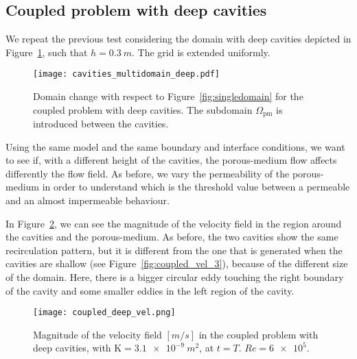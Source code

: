 \subsection{Coupled problem with deep cavities}
We repeat the previous test considering the domain with deep cavities depicted in Figure~\ref{fig:multidomain_deep}, such that $h=\SI{0.3}{m}$. The grid is extended uniformly.
\begin{figure}
	\centering
	\texttt{[image: cavities\_multidomain\_deep.pdf]}
	\caption[Domain change with respect to Figure~\ref{fig:singledomain} for the coupled problem with deep cavities]{Domain change with respect to Figure~\ref{fig:singledomain} for the coupled problem with deep cavities. The subdomain $\Omega_\text{pm}$ is introduced between the cavities.}
	\label{fig:multidomain_deep}
\end{figure}
Using the same model and the same boundary and interface conditions, we want to see if, with a different height of the cavities, the porous-medium flow affects differently the flow field. As before, we vary the permeability of the porous-medium in order to understand which is the threshold value between a permeable and an almost impermeable behaviour.

In Figure~\ref{fig:coupled_vel_deep}, we can see the magnitude of the velocity field in the region around the cavities and the porous-medium. As before, the two cavities show the same recirculation pattern, but it is different from the one that is generated when the cavities are shallow (see Figure~\ref{fig:coupled_vel_3}), because of the different size of the domain. Here, there is a bigger circular eddy touching the right boundary of the cavity and some smaller eddies in the left region of the cavity. 
\begin{figure}
	\centering
	\texttt{[image: coupled\_deep\_vel.png]}
	\caption[Magnitude of the velocity field in the coupled problem with deep cavities]{Magnitude of the velocity field $[\si{m/s}]$ in the coupled problem with deep cavities, with $\mathrm{K}=\SI{3.1e-9}{m^2}$, at $t=T$. $Re=\num{6e5}$.}
	\label{fig:coupled_vel_deep}
\end{figure}

